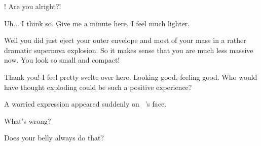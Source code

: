 \documentclass[main.tex]{subfiles}
\begin{document}
\par \Maia \rmmerope! Are you alright?!  

\par \Merope Uh... I think so.  Give me a minute here.  I feel much lighter.

\par \Maia Well you did just eject your outer envelope and most of your mass in a rather dramatic supernova explosion.  So it makes sense that you are much less massive now.  You look so small and compact!  

\par \Merope Thank you!  I feel pretty svelte over here.  Looking good, feeling good.  Who would have thought exploding could be such a positive experience?

\par \nar A worried expression appeared suddenly on \rmmerope~'s face.

\par \Maia What's wrong?

\par \Merope Does your belly always do that?
\end{document}
